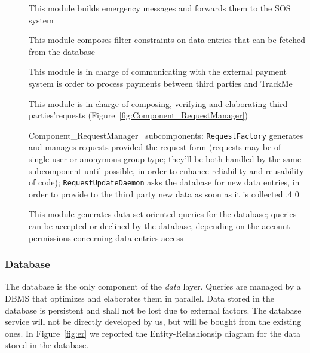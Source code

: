 \documentclass[../DD0.tex]{subfiles}
\begin{document}
\begin{description}
          \item[\EmergencyDispatcher] This module builds emergency messages and forwards them to the SOS system

          \item[\FilterManager] This module composes filter constraints on data entries that can be fetched from the database

          \item[\PaymentGateway] This module is in charge of communicating with the external payment system is order to process payments between third parties and TrackMe

          \item[\RequestManager] This module is in charge of composing, verifying and elaborating third parties'requests (Figure~\ref{fig:Component_RequestManager})

          \fetchUML
            {Component_RequestManager}
            {\RequestManager\ subcomponents: \texttt{RequestFactory} generates and manages requests provided the request form (requests may be of single-user or anonymous-group type; they'll be both handled by the same subcomponent until possible, in order to enhance reliability and reusability of code); \texttt{RequestUpdateDaemon} asks the database for new data entries, in order to provide to the third party new data as soon as it is collected}
            {.4}           %
            {0}           %

          \item[\SetBuilder] This module generates data set oriented queries for the database; queries can be accepted or declined by the database, depending on the account permissions concerning data entries access
        \end{description}

      \subsubsection{Database}

        The database is the only component of the \textit{data} layer. Queries are managed by a DBMS that optimizes and elaborates them in parallel. Data stored in the database is persistent and shall not be lost due to external factors. The database service will not be directly developed by us, but will be bought from the existing ones. In Figure~\ref{fig:er} we reported the Entity-Relashionsip diagram for the data stored in the database.
\end{document}
